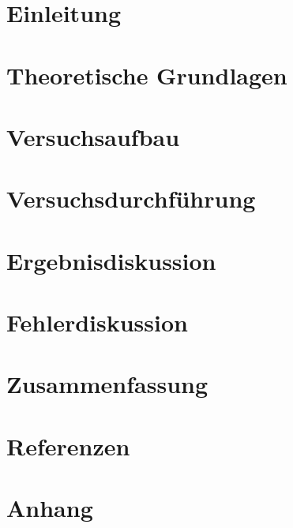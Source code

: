 \documentclass[10pt, a4paper, ngerman]{article}
\begin{document}
\maketitle

\section{Einleitung             }
\section{Theoretische Grundlagen}
\section{Versuchsaufbau         }
\section{Versuchsdurchführung   }
\section{Ergebnisdiskussion     }
\section{Fehlerdiskussion       }
\section{Zusammenfassung        }
\section{Referenzen             }
\section{Anhang                 }
\end{document}
